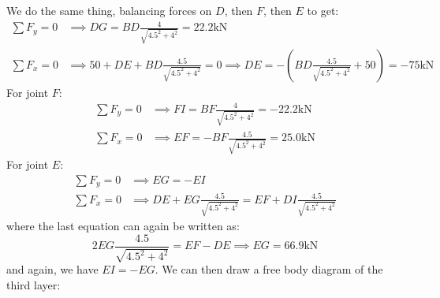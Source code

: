 \documentclass{article}
\begin{document}
We do the same thing, balancing forces on $D$, then $F$, then $E$ to get:
\begin{align}
    \sum F_y = 0 &\implies DG=BD\frac{4}{\sqrt{4.5^2+4^2}} = 22.2\si{\kilo\newton} \\%
    \sum F_x = 0 &\implies 50+DE+BD\frac{4.5}{\sqrt{4.5^2+4^2}} = 0 \implies DE = -(BD\frac{4.5}{\sqrt{4.5^2+4^2}}+50) = -75\si{\kilo\newton} %
\end{align}
For joint $F$:
\begin{align}
    \sum F_y = 0 &\implies FI=BF\frac{4}{\sqrt{4.5^2+4^2}} = -22.2\si{\kilo\newton} \\%
    \sum F_x = 0 &\implies EF = -BF\frac{4.5}{\sqrt{4.5^2+4^2}} = 25.0\si{\kilo\newton}
\end{align}
For joint $E$:
\begin{align}
    \sum F_y = 0 &\implies EG=-EI \\ 
    \sum F_x = 0 &\implies DE+EG\frac{4.5}{\sqrt{4.5^2+4^2}}=EF+DI\frac{4.5}{\sqrt{4.5^2+4^2}}
\end{align}
where the last equation can again be written as:
\begin{equation}
    2EG\frac{4.5}{\sqrt{4.5^2+4^2}} = EF-DE \implies EG = 66.9\si{\kilo\newton} 
    \label{eq:}
\end{equation}
and again, we have $EI=-EG$. We can then draw a free body diagram of the third layer:
\end{document}
